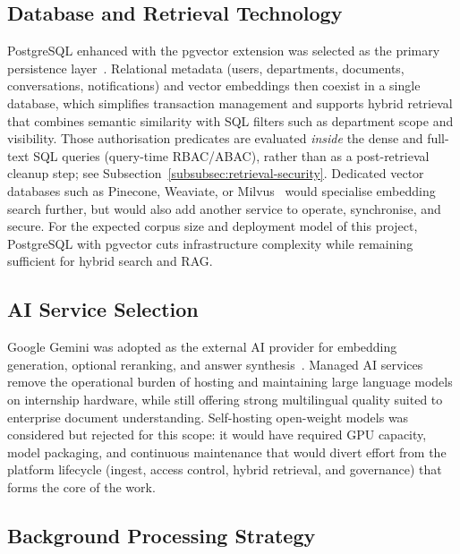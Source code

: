 \subsection{Database and Retrieval Technology}
\label{subsec:database-retrieval-tech}

PostgreSQL enhanced with the pgvector extension was selected as the primary
persistence layer~\cite{pgvector-docs}. Relational metadata (users, departments,
documents, conversations, notifications) and vector embeddings then coexist in a
single database, which simplifies transaction management and supports hybrid
retrieval that combines semantic similarity with SQL filters such as department
scope and visibility. Those authorisation predicates are evaluated
\emph{inside} the dense and full-text SQL queries (query-time RBAC/ABAC), rather
than as a post-retrieval cleanup step; see
Subsection~\ref{subsubsec:retrieval-security}. Dedicated vector databases such as
Pinecone, Weaviate, or Milvus~\cite{pinecone-docs} would specialise embedding
search further, but would also add another service to operate, synchronise, and
secure. For the expected corpus size and deployment model of this project,
PostgreSQL with pgvector cuts infrastructure complexity while remaining
sufficient for hybrid search and RAG.

\subsection{AI Service Selection}
\label{subsec:ai-service-selection}

Google Gemini was adopted as the external AI provider for embedding generation,
optional reranking, and answer synthesis~\cite{google-gemini-docs}. Managed AI
services remove the operational burden of hosting and maintaining large language
models on internship hardware, while still offering strong multilingual quality
suited to enterprise document understanding. Self-hosting open-weight models was
considered but rejected for this scope: it would have required GPU capacity,
model packaging, and continuous maintenance that would divert effort from the
platform lifecycle (ingest, access control, hybrid retrieval, and governance)
that forms the core of the work.

\subsection{Background Processing Strategy}
\label{subsec:background-processing}

